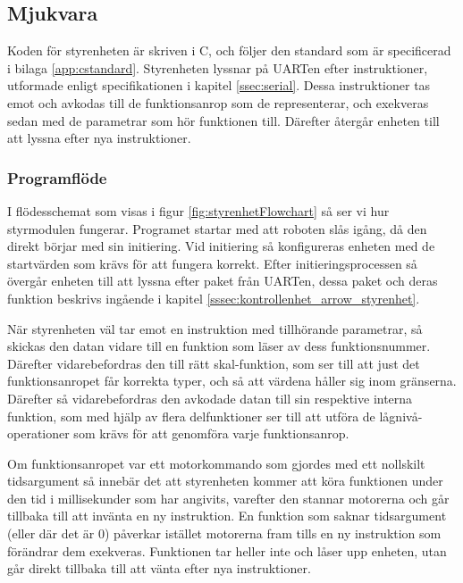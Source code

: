 \documentclass[a4paper,11pt]{article}
\begin{document}
\subsection{Mjukvara}
Koden för styrenheten är skriven i C, och följer den standard som är specificerad i bilaga \ref{app:cstandard}. 
Styrenheten lyssnar på UARTen efter instruktioner, utformade enligt specifikationen i kapitel \ref{ssec:serial}. Dessa instruktioner tas emot och avkodas till de funktionsanrop som de representerar, och exekveras sedan med de parametrar som hör funktionen till. Därefter återgår enheten till att lyssna efter nya instruktioner.

\subsubsection{Programflöde}
I flödesschemat som visas i figur \ref{fig:styrenhetFlowchart} så ser vi hur styrmodulen fungerar. Programet startar med att roboten slås igång, då den direkt börjar med sin initiering. Vid initiering så konfigureras enheten med de startvärden som krävs för att fungera korrekt. Efter initieringsprocessen så övergår enheten till att lyssna efter paket från UARTen, dessa paket och deras funktion beskrivs ingående i kapitel \ref{sssec:kontrollenhet_arrow_styrenhet}. 

När styrenheten väl tar emot en instruktion med tillhörande parametrar, så skickas den datan vidare till en funktion som läser av dess funktionsnummer. Därefter vidarebefordras den till rätt skal-funktion, som ser till att just det funktionsanropet får korrekta typer, och så att värdena håller sig inom gränserna. Därefter så vidarebefordras den avkodade datan till sin respektive interna funktion, som med hjälp av flera delfunktioner ser till att utföra de lågnivå-operationer som krävs för att genomföra varje funktionsanrop. 

Om funktionsanropet var ett motorkommando som gjordes med ett nollskilt tidsargument så innebär det att styrenheten kommer att köra funktionen under den tid i millisekunder som har angivits, varefter den stannar motorerna och går tillbaka till att invänta en ny instruktion. En funktion som saknar tidsargument (eller där det är $0$) påverkar istället motorerna fram tills en ny instruktion som förändrar dem exekveras. Funktionen tar heller inte och låser upp enheten, utan går direkt tillbaka till att vänta efter nya instruktioner.
\end{document}
